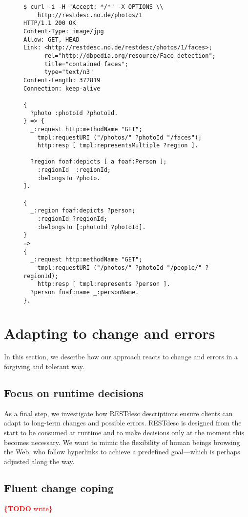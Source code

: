 \documentclass[runningheads,a4paper, twocolumn]{llncs}
\newcommand{\todo}[1]{\noindent\textcolor{red}{{\bf \{TODO} #1{\bf \}}}}
\begin{document}
\begin{figure}[float=h!]
\begin{lstlisting}[caption=Listing showing an OPTIONS call in order to find out about ones options with a concrete photo., label=lst:PhotoOPTIONS, escapechar=§]
$ curl -i -H "Accept: */*" -X OPTIONS \\
    http://restdesc.no.de/photos/1
HTTP/1.1 200 OK
Content-Type: image/jpg
Allow: GET, HEAD
Link: <http://restdesc.no.de/restdesc/photos/1/faces>;
      rel="http://dbpedia.org/resource/Face_detection";
      title="contained faces";
      type="text/n3"
Content-Length: 372819
Connection: keep-alive

{
  ?photo :photoId ?photoId.
} => {
  _:request http:methodName "GET";
    tmpl:requestURI ("/photos/" ?photoId "/faces");
    http:resp [ tmpl:representsMultiple ?region ].
    
  ?region foaf:depicts [ a foaf:Person ];
    :regionId _:regionId;
    :belongsTo ?photo.    
].

{
  _:region foaf:depicts ?person;
    :regionId ?regionId;
    :belongsTo [:photoId ?photoId].
}
=>
{
  _:request http:methodName "GET";
    tmpl:requestURI ("/photos/" ?photoId "/people/" ?regionId);
    http:resp [ tmpl:represents ?person ].
  ?person foaf:name _:personName.
}.
\end{lstlisting}
\end{figure}


\section{Adapting to change and errors} \label{sec:adapting-to-change-and-errors}
In this section, we describe how our  approach reacts to change and errors in a forgiving and tolerant way.

\subsection{Focus on runtime decisions}
As a final step, we investigate how RESTdesc descriptions ensure clients can adapt to long-term changes and possible errors. RESTdesc is designed from the start to be consumed at runtime and to make decisions only at the moment this becomes necessary. We want to mimic the flexibility of human beings browsing the Web, who follow hyperlinks to achieve a predefined goal---which is perhaps adjusted along the way.

\subsection{Fluent change coping}
\todo{write}
\end{document}

